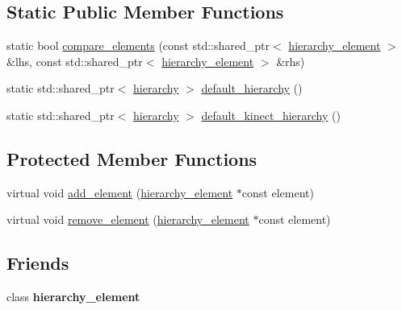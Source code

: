 \subsection*{Static Public Member Functions}
\begin{DoxyCompactItemize}
\item 
static bool \hyperlink{classmae_1_1hierarchy_aedf23999466d28b1b15b0164db02d110}{compare\-\_\-elements} (const std\-::shared\-\_\-ptr$<$ \hyperlink{classmae_1_1hierarchy__element}{hierarchy\-\_\-element} $>$ \&lhs, const std\-::shared\-\_\-ptr$<$ \hyperlink{classmae_1_1hierarchy__element}{hierarchy\-\_\-element} $>$ \&rhs)
\item 
static std\-::shared\-\_\-ptr$<$ \hyperlink{classmae_1_1hierarchy}{hierarchy} $>$ \hyperlink{classmae_1_1hierarchy_a2d5a7b8af3c883a113bd3bf8756181e0}{default\-\_\-hierarchy} ()
\item 
static std\-::shared\-\_\-ptr$<$ \hyperlink{classmae_1_1hierarchy}{hierarchy} $>$ \hyperlink{classmae_1_1hierarchy_a37f364d66c4ee1e4b6e52ad47e0ba2e0}{default\-\_\-kinect\-\_\-hierarchy} ()
\end{DoxyCompactItemize}
\subsection*{Protected Member Functions}
\begin{DoxyCompactItemize}
\item 
virtual void \hyperlink{classmae_1_1hierarchy_ae883a463039fe4fbcaa660e44e25c476}{add\-\_\-element} (\hyperlink{classmae_1_1hierarchy__element}{hierarchy\-\_\-element} $\ast$const element)
\item 
virtual void \hyperlink{classmae_1_1hierarchy_a430b470b34db741bb22552d2a534c733}{remove\-\_\-element} (\hyperlink{classmae_1_1hierarchy__element}{hierarchy\-\_\-element} $\ast$const element)
\end{DoxyCompactItemize}
\subsection*{Friends}
\begin{DoxyCompactItemize}
\item 
\hypertarget{classmae_1_1hierarchy_a7ef536ecd89121e2f44377643ceda64e}{class {\bfseries hierarchy\-\_\-element}}\label{classmae_1_1hierarchy_a7ef536ecd89121e2f44377643ceda64e}

\end{DoxyCompactItemize}


